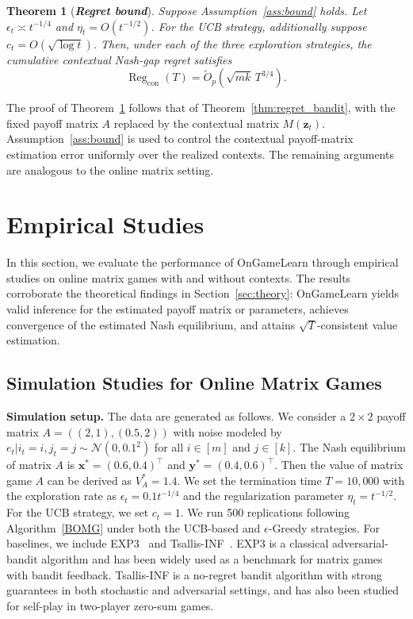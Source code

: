 \documentclass[12pt]{article}
\newtheorem{theorem}{Theorem}
\begin{document}
\begin{theorem}[{\textbf{\emph{Regret bound}}}]
\label{conthm:regret_bandit}
Suppose Assumption~\ref{ass:bound} holds. Let $\epsilon_t\asymp t^{-1/4}$ and $\eta_t=O(t^{-1/2})$.
For the UCB strategy, additionally suppose $c_t=O(\sqrt{\log t})$.
Then, under each of the three exploration strategies, the cumulative contextual Nash-gap regret satisfies
\[
\operatorname{Reg}_{\mathrm{con}}(T)
= \widetilde O_p
\left(
\sqrt{mk}\,T^{3/4}
\right).
\]
\end{theorem}
The proof of Theorem~\ref{conthm:regret_bandit} follows that of Theorem~\ref{thm:regret_bandit}, with the fixed payoff matrix $A$ replaced by the contextual matrix $M(\bm z_t)$. Assumption~\ref{ass:bound} is used to control the contextual payoff-matrix estimation error uniformly over the realized contexts. The remaining arguments are analogous to the online matrix setting.


\section{Empirical Studies}
\label{sec:simulation}

In this section, we evaluate the performance of OnGameLearn through empirical studies on online matrix games with and without contexts. 
The results corroborate the theoretical findings in Section~\ref{sec:theory}: OnGameLearn yields valid inference for the estimated payoff matrix or parameters, achieves convergence of the estimated Nash equilibrium, and attains $\sqrt{T}$-consistent value estimation.


\subsection{Simulation Studies for Online Matrix Games}
\label{sec:simu_multiarm}

\noindent\textbf{Simulation setup.} The data are generated as follows. We consider a $2\times2$ payoff matrix $A = ((2, 1), (0.5, 2))$ with noise modeled by $e_t|i_t=i,j_t=j \sim \mathcal{N}(0,0.1^2)$ for all $i \in [m]$ and $j \in [k]$. The Nash equilibrium of matrix $A$ is $\bm{x}^\ast = (0.6,0.4)^\top$ and $\bm{y}^\ast = (0.4,0.6)^\top$. Then the value of matrix game $A$ can be derived as $V^\ast_A=1.4$. We set the termination time $T=10,000$ with the exploration rate as $\epsilon_t = 0.1 t^{-1/4}$ and the regularization parameter $\eta_t = t^{-1/2}$. For the UCB strategy, we set $c_t=1$. We run 500 replications following Algorithm~\ref{BOMG} under both the UCB-based and $\epsilon$-Greedy strategies.
For baselines, we include EXP3~\citep{auer2002nonstochastic,o2021matrix} and Tsallis-INF~\citep{zimmert2021tsallis,ito2025instance}. EXP3 is a classical adversarial-bandit algorithm and has been widely used as a benchmark for matrix games with bandit feedback. Tsallis-INF is a no-regret bandit algorithm with strong guarantees in both stochastic and adversarial settings, and has also been studied for self-play in two-player zero-sum games.
\end{document}
